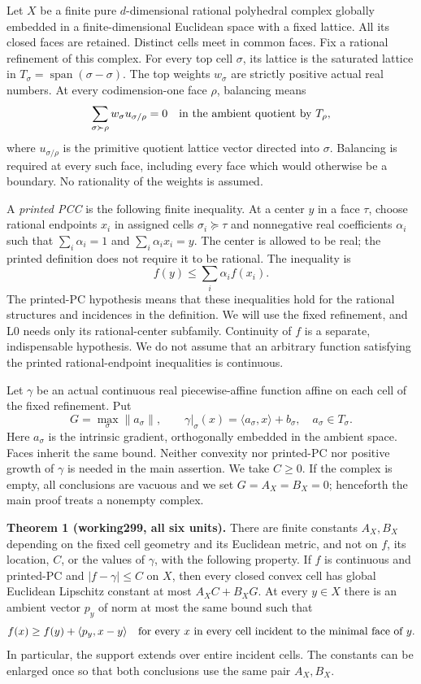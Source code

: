 \documentclass[
  11pt,
]{article}
\begin{document}
Let \(X\) be a finite pure \(d\)-dimensional rational polyhedral complex
globally embedded in a finite-dimensional Euclidean space with a fixed
lattice. All its closed faces are retained. Distinct cells meet in
common faces. Fix a rational refinement of this complex. For every top
cell \(\sigma\), its lattice is the saturated lattice in
\(T_\sigma=\operatorname{span}(\sigma-\sigma)\). The top weights
\(w_\sigma\) are strictly positive actual real numbers. At every
codimension-one face \(\rho\), balancing means \[
\sum_{\sigma\succ\rho} w_\sigma u_{\sigma/\rho}=0
\quad\hbox{in the ambient quotient by }T_\rho,
\] where \(u_{\sigma/\rho}\) is the primitive quotient lattice vector
directed into \(\sigma\). Balancing is required at every such face,
including every face which would otherwise be a boundary. No rationality
of the weights is assumed.

A \emph{printed PCC} is the following finite inequality. At a center
\(y\) in a face \(\tau\), choose rational endpoints \(x_i\) in assigned
cells \(\sigma_i\succeq\tau\) and nonnegative real coefficients
\(\alpha_i\) such that \(\sum_i\alpha_i=1\) and
\(\sum_i\alpha_i x_i=y\). The center is allowed to be real; the printed
definition does not require it to be rational. The inequality is
\[ f(y)\leq\sum_i\alpha_i f(x_i). \] The printed-PC hypothesis means
that these inequalities hold for the rational structures and incidences
in the definition. We will use the fixed refinement, and L0 needs only
its rational-center subfamily. Continuity of \(f\) is a separate,
indispensable hypothesis. We do not assume that an arbitrary function
satisfying the printed rational-endpoint inequalities is continuous.

Let \(\gamma\) be an actual continuous real piecewise-affine function
affine on each cell of the fixed refinement. Put \[
G=\max_\sigma\|a_\sigma\|,
\qquad \gamma|_\sigma(x)=\langle a_\sigma,x\rangle+b_\sigma,
\quad a_\sigma\in T_\sigma.
\] Here \(a_\sigma\) is the intrinsic gradient, orthogonally embedded in
the ambient space. Faces inherit the same bound. Neither convexity nor
printed-PC nor positive growth of \(\gamma\) is needed in the main
assertion. We take \(C\geq0\). If the complex is empty, all conclusions
are vacuous and we set \(G=A_X=B_X=0\); henceforth the main proof treats
a nonempty complex.

\textbf{Theorem 1 (working299, all six units).} There are finite
constants \(A_X,B_X\) depending on the fixed cell geometry and its
Euclidean metric, and not on \(f\), its location, \(C\), or the values
of \(\gamma\), with the following property. If \(f\) is continuous and
printed-PC and \(|f-\gamma|\leq C\) on \(X\), then every closed convex
cell has global Euclidean Lipschitz constant at most \(A_XC+B_XG\). At
every \(y\in X\) there is an ambient vector \(p_y\) of norm at most the
same bound such that \[
f(x)\geq f(y)+\langle p_y,x-y\rangle
\quad\hbox{for every }x\hbox{ in every cell incident to the minimal face of }y.
\] In particular, the support extends over entire incident cells. The
constants can be enlarged once so that both conclusions use the same
pair \(A_X,B_X\).
\end{document}
